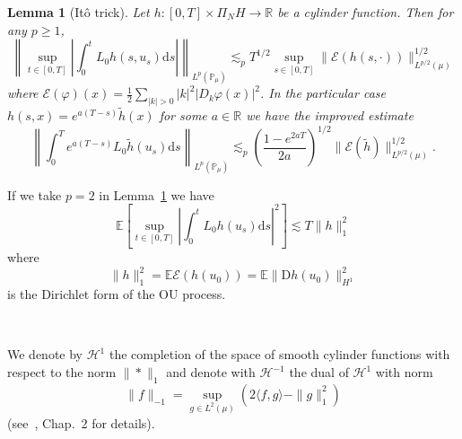 \documentclass[a4paper,11pt]{article}
\newcommand{\mathD}{\mathrm{D}}
\newcommand{\mathd}{\mathrm{d}}
\newcommand{\nobracket}{}
\newtheorem{lemma}{Lemma}
\newcommand{\HH}{\mathscr{H}}
\begin{document}
\begin{lemma}
  [It{\^o} trick]\label{lemma:ito-trick}Let $h : [0, T] \times \Pi_N H \to
  \mathbb{R}$ be a cylinder function. Then for any $p \geq 1$,
  \begin{equation}
    \label{eq:ito-trick} \left\| \sup_{t \in [0, T]} \left| \int_0^t L_0 h (s,
    u_s) \mathd s \right| \right\|_{L^p (\mathbb{P}_{\mu})} \lesssim_p T^{1 /
    2} \sup_{s \in [0, T]} \| \mathcal{E}(h (s, \cdot)) \nobracket \|^{1 /
    2}_{L^{p / 2} (\mu)}
  \end{equation}
  where $\mathcal{E} (\varphi) (x) = \frac{1}{2}  \sum_{| k | > 0} |k|^2  |D_k
  \varphi (x) |^2$. In the particular case $h (s, x) = e^{a (T - s)} \tilde{h}
  (x)$ for some $a \in \mathbb{R}$ we have the improved estimate
  \begin{equation}
    \left\| \int_0^T e^{a (T - s)} L_0  \tilde{h} (u_s) \mathd s \right\|_{L^p
    (\mathbb{P}_{\mu})} \lesssim_p \left( \frac{1 - e^{2 aT}}{2 a} \right)^{1
    / 2} \| \mathcal{E}(\tilde{h}) \|^{1 / 2}_{L^{p / 2} (\mu)} .
    \label{eq:ito-trick-conv}
  \end{equation}
\end{lemma}

If we take $p = 2$ in Lemma~\ref{lemma:ito-trick} we have
\[ \mathbb{E} \left[ \sup_{t \in [0, T]} \left| \int_0^t L_0 h (u_s) \mathd s
   \right|^2_{} \right] \lesssim T \| h \|_1^2 \]
where
\[ \| h \|_1^2 =\mathbb{E}\mathcal{E} (h (u_0)) =\mathbb{E} \| \mathD h
   (u_0) \|_{H^1}^2 \]
is the Dirichlet form of the OU process.

\

We denote by $\HH^1$ the completion of the space of smooth cylinder functions
with respect to the norm $\| \ast \|_1$ and denote with $\HH^{- 1}$ the dual
of $\HH^1$ with norm
\[ \| f \|_{- 1} = \sup_{g \in L^2 (\mu)} (2 \langle f, g \rangle - \| g
   \|^2_1) \]
(see~{\cite{fluctuations_2012}}, Chap.~2 for details).

\
\end{document}
